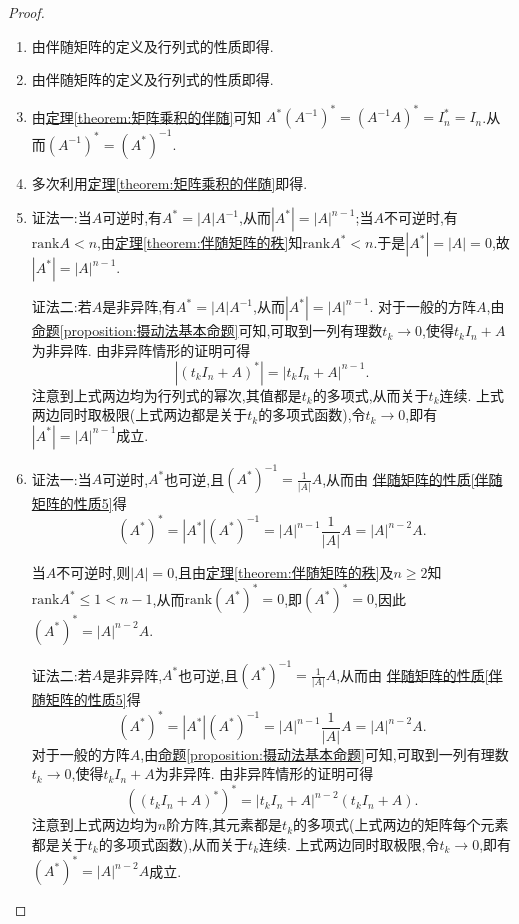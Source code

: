 \documentclass[../../main.tex]{subfiles}%
\begin{document}
\begin{proof}
\begin{enumerate}
\item 由伴随矩阵的定义及行列式的性质即得.

\item 由伴随矩阵的定义及行列式的性质即得.

\item 由\hyperref[theorem:矩阵乘积的伴随]{定理\ref{theorem:矩阵乘积的伴随}}可知
$A^*\left( A^{-1} \right) ^*=\left( A^{-1}A \right) ^*=I_{n}^{*}=I_n$.从而$(A^{-1})^* = (A^*)^{-1}$.

\item 多次利用\hyperref[theorem:矩阵乘积的伴随]{定理\ref{theorem:矩阵乘积的伴随}}即得.

\item {\color{blue}证法一:}当\(A\)可逆时,有\(A^* = |A|A^{-1}\),从而\(|A^*| = |A|^{n - 1}\);当\(A\)不可逆时,有$\mathrm{rank}A<n$,由\hyperref[theorem:伴随矩阵的秩]{定理\ref{theorem:伴随矩阵的秩}}知$\mathrm{rank}A^*<n$.于是\(|A^*| = |A| = 0\),故\(|A^*| = |A|^{n - 1}\).

{\color{blue}证法二:}若\(A\)是非异阵,有\(A^* = |A|A^{-1}\),从而\(|A^*| = |A|^{n - 1}\). 对于一般的方阵\(A\),由\hyperref[proposition:摄动法基本命题]{命题\ref{proposition:摄动法基本命题}}可知,可取到一列有理数\(t_k\rightarrow0\),使得\(t_kI_n + A\)为非异阵. 由非异阵情形的证明可得
\[
|(t_kI_n + A)^*| = |t_kI_n + A|^{n - 1}.
\]
注意到上式两边均为行列式的幂次,其值都是\(t_k\)的多项式,从而关于\(t_k\)连续. 上式两边同时取极限(上式两边都是关于$t_k$的多项式函数),令\(t_k\rightarrow0\),即有\(|A^*| = |A|^{n - 1}\)成立.

\item {\color{blue}证法一:}当\(A\)可逆时,\(A^*\)也可逆,且\((A^*)^{-1} = \frac{1}{|A|}A\),从而由 \hyperref[伴随矩阵的性质5]{伴随矩阵的性质\ref{伴随矩阵的性质5}}得
\[
(A^*)^* = |A^*|(A^*)^{-1} = |A|^{n - 1}\frac{1}{|A|}A = |A|^{n - 2}A.
\]

当\(A\)不可逆时,则\(|A| = 0\),且由\hyperref[theorem:伴随矩阵的秩]{定理\ref{theorem:伴随矩阵的秩}}及$n\geqslant  2$知\(\mathrm{rank}A^* \leqslant  1<n-1\),从而\(\mathrm{rank}(A^*)^* = 0\),即\((A^*)^* = 0\),因此\((A^*)^* = |A|^{n - 2}A\).

{\color{blue}证法二:}若\(A\)是非异阵,\(A^*\)也可逆,且\((A^*)^{-1} = \frac{1}{|A|}A\),从而由 \hyperref[伴随矩阵的性质5]{伴随矩阵的性质\ref{伴随矩阵的性质5}}得
\[
(A^*)^* = |A^*|(A^*)^{-1} = |A|^{n - 1}\frac{1}{|A|}A = |A|^{n - 2}A.
\]
对于一般的方阵\(A\),由\hyperref[proposition:摄动法基本命题]{命题\ref{proposition:摄动法基本命题}}可知,可取到一列有理数\(t_k\rightarrow0\),使得\(t_kI_n + A\)为非异阵. 由非异阵情形的证明可得
\[
((t_kI_n + A)^*)^* = |t_kI_n + A|^{n - 2}(t_kI_n + A).
\]
注意到上式两边均为\(n\)阶方阵,其元素都是\(t_k\)的多项式(上式两边的矩阵每个元素都是关于$t_k$的多项式函数),从而关于\(t_k\)连续. 上式两边同时取极限,令\(t_k\rightarrow0\),即有\((A^*)^* = |A|^{n - 2}A\)成立. 
\end{enumerate}

\end{proof}
\end{document}
